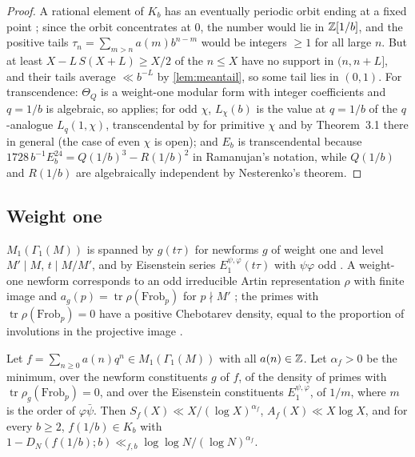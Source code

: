 \documentclass[11pt]{article}
\DeclareMathOperator{\tr}{tr}
\newcommand{\LL}{\log\log N}
\begin{document}
\begin{proof}
A rational element of $K_b$ has an eventually periodic orbit ending at a fixed point
\cite{DiscrepancyCompanion}; since the orbit concentrates at $0$, the number would lie in
$\mathbb Z[1/b]$, and the positive tails $\tau_n=\sum_{m>n}a(m)b^{n-m}$ would be integers $\ge1$ for all
large $n$. But at least $X-L\,S(X+L)\ge X/2$ of the $n\le X$ have no support in $(n,n+L]$, and their
tails average $\ll b^{-L}$ by \cref{lem:meantail}, so some tail lies in $(0,1)$. For transcendence:
$\Theta_Q$ is a weight-one modular form with integer coefficients and $q=1/b$ is algebraic, so
\cite[Thm.~3.1]{HamiehMurty2016} applies; for odd $\chi$, $L_\chi(b)$ is the value at $q=1/b$ of
the $q$-analogue $L_q(1,\chi)$, transcendental by \cite[Thm.~1.1]{HamiehMurty2016} for primitive
$\chi$ and by Theorem~3.1 there in general (the case of even $\chi$ is open); and $E_b$ is
transcendental because
$1728\,b^{-1}E_b^{24}=Q(1/b)^3-R(1/b)^2$ in Ramanujan's notation, while $Q(1/b)$ and $R(1/b)$ are
algebraically independent by Nesterenko's theorem.
\end{proof}

\subsection{Weight one}\label{subsec:weightone}

\begin{theorem}\label{thm:weightoneinput}
$M_1(\Gamma_1(M))$ is spanned by $g(t\tau)$ for newforms $g$ of weight one and level $M'\mid M$,
$t\mid M/M'$, and by Eisenstein series $E_1^{\psi,\varphi}(t\tau)$ with $\psi\varphi$ odd
\cite[Thms.~4.8.1, 5.8.3]{DiamondShurman}. A weight-one newform corresponds to an odd irreducible
Artin representation $\rho$ with finite image and $a_g(p)=\tr\rho(\mathrm{Frob}_p)$ for $p\nmid M'$
\cite{DeligneSerre1974}; the primes with $\tr\rho(\mathrm{Frob}_p)=0$ have a positive Chebotarev
density, equal to the proportion of involutions in the projective image
\cite[Thm.~18]{Serre1981}.
\end{theorem}

\begin{theorem}\label{thm:weightone}
Let $f=\sum_{n\ge0}a(n)q^n\in M_1(\Gamma_1(M))$ with all $a(n)\in\mathbb Z$. Let $\alpha_f>0$ be the minimum,
over the newform constituents $g$ of $f$, of the density of primes with $\tr\rho_g(\mathrm{Frob}_p)=0$,
and over the Eisenstein constituents $E_1^{\psi,\varphi}$, of $1/m$, where $m$ is the order of
$\varphi\bar\psi$. Then $S_f(X)\ll X/(\log X)^{\alpha_f}$, $A_f(X)\ll X\log X$, and for every $b\ge2$,
$f(1/b)\in K_b$ with $1-D_N(f(1/b);b)\ll_{f,b}\LL/(\log N)^{\alpha_f}$.
\end{theorem}
\end{document}
